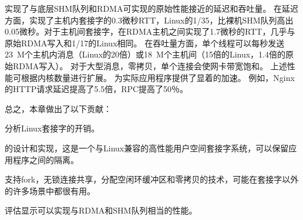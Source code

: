 
\sys {}实现了与底层SHM队列和RDMA可实现的原始性能接近的延迟和吞吐量。
在延迟方面，\sys {}实现了主机内套接字的0.3微秒RTT，Linux的1/35，比裸机SHM队列高出0.05微秒。对于主机间套接字，\sys {}在RDMA主机之间实现了1.7微秒的RTT，几乎与原始RDMA写入和1/17的Linux相同。
在吞吐量方面，单个线程可以每秒发送23~M个主机内消息（Linux的20倍）或18~M个主机间（15倍的Linux，1.4倍的原始RDMA写入）。
对于大型消息，零拷贝，单个连接会使网卡带宽饱和。
上述性能可根据内核数量进行扩展。
\sys {}为实际应用程序提供了显着的加速。
例如，Nginx~ \cite {nginx}的HTTP请求延迟提高了5.5倍，RPC提高了50％。

总之，本章做出了以下贡献：
\begin{ecompact}
\item 分析Linux套接字的开销。
\item \sys {}的设计和实现，这是一个与Linux兼容的高性能用户空间套接字系统，可以保留应用程序之间的隔离。
\item 支持fork，无锁连接共享，分配空闲环缓冲区和零拷贝的技术，可能在套接字以外的许多场景中都很有用。
\item 评估显示\sys {}可以实现与RDMA和SHM队列相当的性能。
\end{ecompact}


